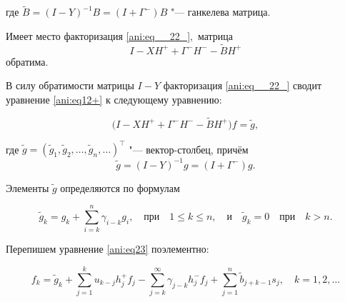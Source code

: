 где $\tilde{B}= (I-Y) ^{-1} B=\left(I+\Gamma^{-} \right)B$ "--- ганкелева матрица.



\smallskip



\hypertarget{ani:eqt1}{}

\begin{theorem}

Имеет место факторизация \eqref{ani:eq__22_}$,$ матрица $$I-XH^{+} +\Gamma ^{-} H^{-} -\tilde{B}H^{+} $$ обратима$.$

\end{theorem}






\smallskip




В силу обратимости матрицы  $I-Y$ факторизация \eqref{ani:eq__22_} сводит уравнение \eqref{ani:eq12+} к следующему уравнению:

\begin{equation}\label{ani:eq23}

\bigl({I} -XH^{+} +\Gamma ^{-} H^{-} -\tilde{B}H^{+} \bigr)f=\tilde{g},

\end{equation}

где  $\tilde{g}=\left(\tilde{g}_{1} ,  \tilde{g}_{2}, \dots ,  \tilde{g}_{n} ,  \dots \right)^{\top} $ "--- вектор-столбец, причём $$\tilde{g}=\left({I} -Y\right)^{-1} g=\left({I} +\Gamma ^{-} \right)g.$$  

Элементы $\tilde{g}$ определяются по формулам

\begin{equation}\label{ani:eq24}

\tilde{g}_{k} =g_{k} +\sum\limits _{i=k}^{n}\gamma _{i-k} g_{i}, \quad\mbox{при}\quad 1\le k\le n,\quad\mbox{и}\quad \tilde{g}_{k} =0\quad\mbox{при}\quad k>n.

\end{equation}



Перепишем уравнение \eqref{ani:eq23} поэлементно:

\begin{equation} \label{ani:eq__25_} f_{k} =\tilde{g}_{k} +\sum\limits _{j=1}^{k}u_{k-j} h_{j}^{+} f_{j}  -\sum\limits _{j=k}^{\infty }\gamma _{j-k} h_{j}^{-} f_{j}  + \sum\limits _{j=1}^{n}\tilde{b}_{j+k-1} s_{j},   \quad    k=1, 2, \ldots

\end{equation}

